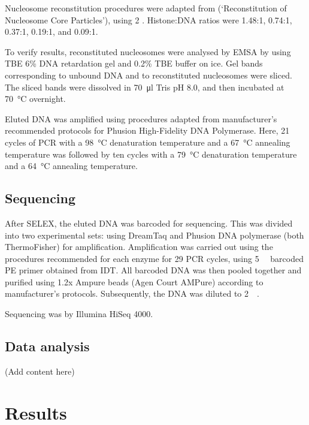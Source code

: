 \documentclass[parskip=full, numbers=noenddot]{scrreprt}
\begin{document}
Nucleosome reconstitution procedures were adapted from \citet{dyer_reconstitution_2003} (`Reconstitution of Nucleosome Core Particles'), using \SI{2}{\Molar} .  Histone:DNA ratios were 1.48:1, 0.74:1, 0.37:1, 0.19:1, and 0.09:1. %

To verify results, reconstituted nucleosomes were analysed by EMSA by using TBE 6\% DNA retardation gel and 0.2\% TBE buffer on ice.  Gel bands corresponding to unbound DNA and to reconstituted nucleosomes were sliced.  The sliced bands were dissolved in \SI{70}{\micro\litre} Tris pH 8.0, and then incubated at \SI{70}{\celsius} overnight.

Eluted DNA was amplified using procedures adapted from manufacturer's recommended protocols for Phusion High-Fidelity DNA Polymerase.  Here, 21 cycles of PCR with a \SI{98}{\celsius} denaturation temperature and a \SI{67}{\celsius} annealing temperature was followed by ten cycles with a \SI{79}{\celsius} denaturation temperature and a \SI{64}{\celsius} annealing temperature.

\subsection{Sequencing}
\label{ssec:emsaselex_methods_seq}

After SELEX, the eluted DNA was barcoded for sequencing. This was divided into two experimental sets: using DreamTaq and Phusion DNA polymerase (both ThermoFisher) for amplification.  Amplification was carried out using the procedures recommended for each enzyme for 29 PCR cycles, using \SI{5}{\micro\Molar} barcoded PE primer obtained from IDT.  All barcoded DNA was then pooled together and purified using 1.2x Ampure beads (Agen Court AMPure) according to manufacturer's protocols.  Subsequently, the DNA was diluted to \SI{2}{\nano\Molar}.

Sequencing was by Illumina HiSeq 4000.

\subsection{Data analysis}
\label{ssec:emsaselex_methods_anal}

(Add content here)

\section{Results}
\label{sec:emsaselex_results}
\end{document}
